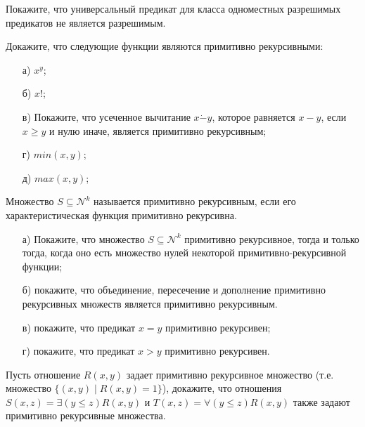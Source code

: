 
\newcommand{\dom}[2]{\left[\frac{#1}{#2}\right]}

\begin{task}
	Покажите, что универсальный предикат для класса одноместных разрешимых предикатов не является разрешимым.
\end{task}


\begin{task}
    Докажите, что следующие функции являются примитивно рекурсивными:
    \begin{enumerate}[topsep = 0pt, itemsep = -1ex]
        \item [а)] $x^y$;
        \item [б)] $x!$;
        \item [в)] Покажите, что усеченное вычитание $x \dot{-} y$, которое равняется $x - y$, если $x \ge y$ и нулю иначе,
			является примитивно рекурсивным; 
    	\item [г)] $min(x, y)$;
        \item [д)] $max(x, y)$;
    \end{enumerate}
\end{task}


\vspace{0.5cm}

Множество $S \subseteq \mathcal{N}^k$ называется примитивно рекурсивным, если его характеристическая функция примитивно
рекурсивна.

\begin{task}	
    \begin{enumerate}[topsep = 0pt, itemsep = -1ex]
        \item [а)] Покажите, что множество $S \subseteq \mathcal{N}^k$ примитивно рекурсивное, тогда и только тогда, когда оно
			есть множество нулей некоторой примитивно-рекурсивной функции;
        \item [б)] покажите, что объединение, пересечение и дополнение примитивно рекурсивных множеств является примитивно
			рекурсивным.
        \item [в)] покажите, что предикат $x = y$ примитивно рекурсивен;
        \item [г)] покажите, что предикат $x > y$ примитивно рекурсивен.
    \end{enumerate}
\end{task}


\begin{task}
    Пусть отношение $R(x, y)$ задает примитивно рекурсивное множество (т.е. множество $\{(x, y) \mid R(x, y) = 1\}$), докажите,
    что отношения $S(x, z) = \exists (y \le z) R(x, y)$ и $T(x, z) = \forall (y \le z) R(x, y)$ также задают примитивно
    рекурсивные множества.
\end{task}

